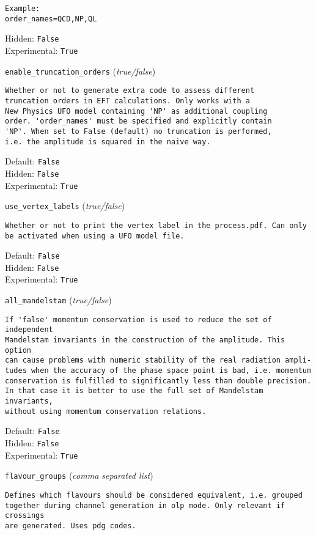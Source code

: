 \begin{basedescript}{\desclabelstyle{\pushlabel}}
\begin{verbatim}
Example:
order_names=QCD,NP,QL
\end{verbatim}
Hidden: \verb|False|
\\Experimental: \verb|True|
\\\item[\colorbox{gray!30}{\texttt{enable\_truncation\_orders}}] (\textit{true/false})
\begin{verbatim}
Whether or not to generate extra code to assess different
truncation orders in EFT calculations. Only works with a
New Physics UFO model containing 'NP' as additional coupling
order. 'order_names' must be specified and explicitly contain
'NP'. When set to False (default) no truncation is performed,
i.e. the amplitude is squared in the naive way.
\end{verbatim}
Default: \verb|False|
\\Hidden: \verb|False|
\\Experimental: \verb|True|
\\\item[\colorbox{gray!30}{\texttt{use\_vertex\_labels}}] (\textit{true/false})
\begin{verbatim}
Whether or not to print the vertex label in the process.pdf. Can only
be activated when using a UFO model file.
\end{verbatim}
Default: \verb|False|
\\Hidden: \verb|False|
\\Experimental: \verb|True|
\\\item[\colorbox{gray!30}{\texttt{all\_mandelstam}}] (\textit{true/false})
\begin{verbatim}
If 'false' momentum conservation is used to reduce the set of independent
Mandelstam invariants in the construction of the amplitude. This option
can cause problems with numeric stability of the real radiation ampli-
tudes when the accuracy of the phase space point is bad, i.e. momentum
conservation is fulfilled to significantly less than double precision.
In that case it is better to use the full set of Mandelstam invariants,
without using momentum conservation relations.
\end{verbatim}
Default: \verb|False|
\\Hidden: \verb|False|
\\Experimental: \verb|True|
\\\item[\colorbox{gray!30}{\texttt{flavour\_groups}}] (\textit{comma separated list})
\begin{verbatim}
Defines which flavours should be considered equivalent, i.e. grouped
together during channel generation in olp mode. Only relevant if crossings
are generated. Uses pdg codes.


\end{verbatim}
\end{basedescript}
